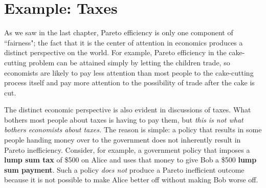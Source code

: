 \begin{comment}
\section{Example: Christmas presents}

Consider, for example, receiving from Grandmother a gift pack of processed cheese food from the Wisconsin Cheeseman (http://www.wisconsincheeseman.com/). Grandmother may have paid \$20 for the gift pack, but you may only value it at only \$5. This is Pareto inefficient: a Pareto improvement would be for her to spend \$20 on a gift (say, a book) that you actually value at \$20. (Of course, you may also place some value on the thought \&etc that went into Grandmother's gift of processed cheese food. But presumably you would place as much or more value on the thought &etc that would go into her gift of the book.)

Say something here about gift certificates?

 Joel Waldfogel, ``The Deadweight Loss of Christmas," \emph{American Economic Review} 83:1328-1336 (1993). Estimates loss at 10 - 33\%; with \$40 billion spent annually on Christmas gifts, a conservative estimate is about \$5 billion. (``I find that holiday gift-giving destroys between 10\% and a third of the value of gifts.... Holiday expenditures average \$40 billion per year, implying that a conservative estimate of the deadweight loss of Christmas is [about \$4 billion].")
\end{comment}




\section{Example: Taxes}

As we saw in the last chapter, Pareto efficiency is only one component of ``fairness"; the fact that it is the center of attention in economics produces a distinct perspective on the world. For example, Pareto efficiency in the cake-cutting problem can be attained simply by letting the children trade, so economists are likely to pay less attention than most people to the cake-cutting process itself and pay more attention to the possibility of trade after the cake is cut.

The distinct economic perspective is also evident in discussions of taxes. What bothers most people about taxes is having to pay them, but \emph{this is not what bothers economists about taxes.} The reason is simple: a policy that results in some people handing money over to the government does not inherently result in Pareto inefficiency. Consider, for example, a government policy that imposes a \textbf{lump sum tax} of \$500 on Alice and uses that money to give Bob a \$500 \textbf{lump sum payment}. Such a policy \emph{does not} produce a Pareto inefficient outcome because it is not possible to make Alice better off without making Bob worse off.

